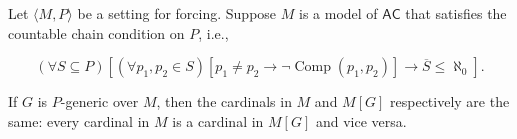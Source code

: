 Let $\langle M, P \rangle$ be a setting for forcing. Suppose $M$ is a model of $\mathsf{AC}$ that satisfies the countable chain condition on $P$, i.e.,

$$(\forall S \subseteq P)\left[(\forall p_1, p_2 \in S)[p_1 \neq p_2 \rightarrow \neg \operatorname{Comp}(p_1, p_2)] \rightarrow \overline{S} \leq \aleph_0\right].$$

If $G$ is $P$-generic over $M$, then the cardinals in $M$ and $M[G]$ respectively are the same: every cardinal in $M$ is a cardinal in $M[G]$ and vice versa.
